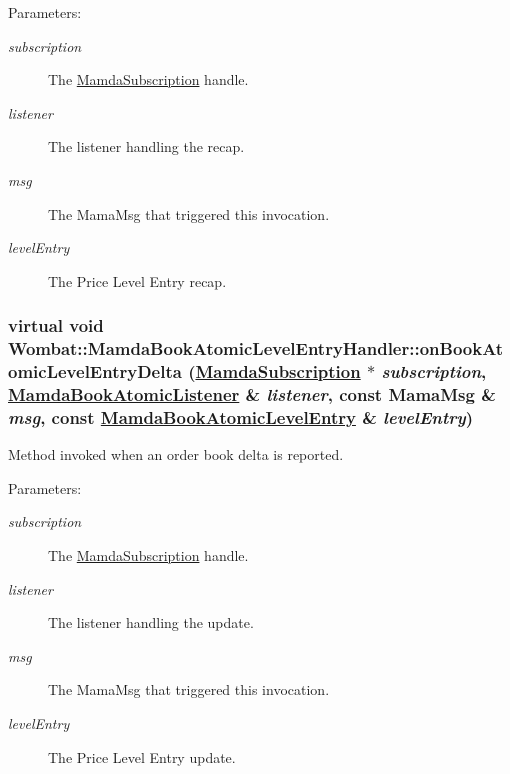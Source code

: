 \begin{Desc}
\item[Parameters:]
\begin{description}
\item[{\em subscription}]The \hyperlink{classWombat_1_1MamdaSubscription}{Mamda\-Subscription} handle. \item[{\em listener}]The listener handling the recap. \item[{\em msg}]The Mama\-Msg that triggered this invocation. \item[{\em level\-Entry}]The Price Level Entry recap. \end{description}
\end{Desc}
\hypertarget{classWombat_1_1MamdaBookAtomicLevelEntryHandler_a3a33ed581eed6abe4738bdced91cfb5}{
\subsubsection[onBookAtomicLevelEntryDelta]{\setlength{\rightskip}{0pt plus 5cm}virtual void Wombat::Mamda\-Book\-Atomic\-Level\-Entry\-Handler::on\-Book\-Atomic\-Level\-Entry\-Delta (\hyperlink{classWombat_1_1MamdaSubscription}{Mamda\-Subscription} $\ast$ {\em subscription}, \hyperlink{classWombat_1_1MamdaBookAtomicListener}{Mamda\-Book\-Atomic\-Listener} \& {\em listener}, const Mama\-Msg \& {\em msg}, const \hyperlink{classWombat_1_1MamdaBookAtomicLevelEntry}{Mamda\-Book\-Atomic\-Level\-Entry} \& {\em level\-Entry})}}
\label{classWombat_1_1MamdaBookAtomicLevelEntryHandler_a3a33ed581eed6abe4738bdced91cfb5}


Method invoked when an order book delta is reported. 

\begin{Desc}
\item[Parameters:]
\begin{description}
\item[{\em subscription}]The \hyperlink{classWombat_1_1MamdaSubscription}{Mamda\-Subscription} handle. \item[{\em listener}]The listener handling the update. \item[{\em msg}]The Mama\-Msg that triggered this invocation. \item[{\em level\-Entry}]The Price Level Entry update. \end{description}
\end{Desc}
